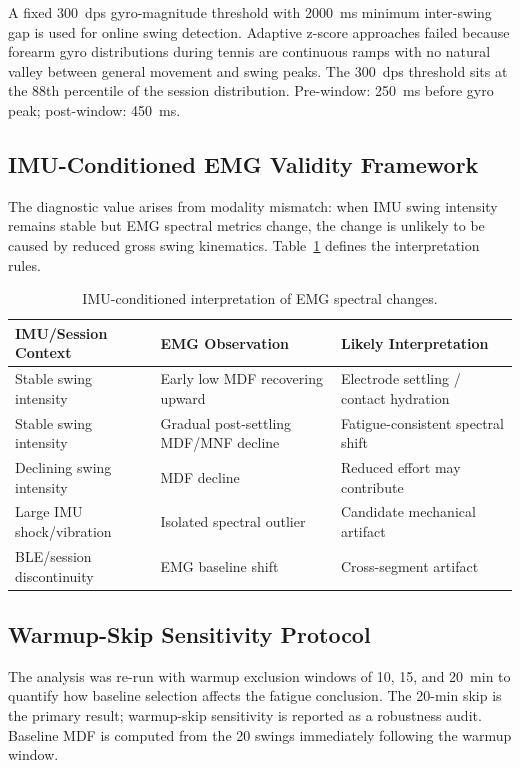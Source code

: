 \documentclass[sensors,article,submit,pdftex,moreauthors]{Definitions/mdpi}
\begin{document}
A fixed 300~dps gyro-magnitude threshold with 2000~ms minimum inter-swing gap is used
for online swing detection. Adaptive z-score approaches failed because forearm gyro
distributions during tennis are continuous ramps with no natural valley between
general movement and swing peaks. The 300~dps threshold sits at the 88th percentile
of the session distribution. Pre-window: 250~ms before gyro peak; post-window: 450~ms.

\subsection{IMU-Conditioned EMG Validity Framework}
\label{sec:imu_cond}

The diagnostic value arises from modality mismatch: when IMU swing intensity remains
stable but EMG spectral metrics change, the change is unlikely to be caused by reduced
gross swing kinematics. Table~\ref{tab:validity} defines the interpretation rules.

\begin{table}[H]
\caption{IMU-conditioned interpretation of EMG spectral changes.\label{tab:validity}}
\begin{tabularx}{\textwidth}{p{4.0cm}p{4.5cm}p{5.5cm}}
\toprule
\textbf{IMU/Session Context} & \textbf{EMG Observation} & \textbf{Likely Interpretation} \\
\midrule
Stable swing intensity & Early low MDF recovering upward & Electrode settling / contact hydration \\
Stable swing intensity & Gradual post-settling MDF/MNF decline & Fatigue-consistent spectral shift \\
Declining swing intensity & MDF decline & Reduced effort may contribute \\
Large IMU shock/vibration & Isolated spectral outlier & Candidate mechanical artifact \\
BLE/session discontinuity & EMG baseline shift & Cross-segment artifact \\
\bottomrule
\end{tabularx}
\end{table}

\subsection{Warmup-Skip Sensitivity Protocol}

The analysis was re-run with warmup exclusion windows of 10, 15, and 20~min to quantify
how baseline selection affects the fatigue conclusion. The 20-min skip is the primary
result; warmup-skip sensitivity is reported as a robustness audit. Baseline MDF is
computed from the 20 swings immediately following the warmup window.
\end{document}
